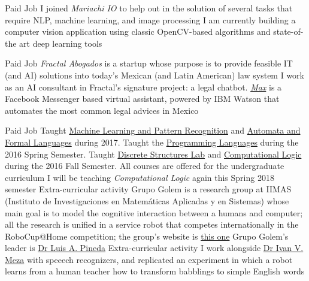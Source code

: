 \documentclass[11pt,a4paper,sans]{moderncv} %
\begin{document}
        {Paid Job}
        {I joined \emph{Mariachi IO} to help out in the solution of several tasks that require NLP, machine learning, and image processing}
        {I am currently building a computer vision application using classic OpenCV-based algorithms and state-of-the art deep learning tools}
        {}
        {}

        {Paid Job}
        {\emph{Fractal Abogados} is a startup whose purpose is to provide feasible IT (and AI) solutions into today's Mexican (and Latin American) law system}
        {I work as an AI consultant in Fractal's signature project: a legal chatbot. \href{https://m.me/fractal-abogados}{\emph{Max}} is a Facebook Messenger based virtual assistant, powered by IBM Watson that automates the most common legal advices in Mexico}
        {}
        {}

        {Paid Job}
        {Taught \href{http://turing.iimas.unam.mx/~ivanvladimir/page/curso_rpyaa}{Machine Learning and Pattern Recognition} and \href{https://sites.google.com/site/automataslengformales20172/}{Automata and Formal Languages} during 2017. Taught the \href{https://sites.google.com/site/lengprog20162/}{Programming Languages} during the 2016 Spring Semester. Taught \href{https://sites.google.com/a/ciencias.unam.mx/estructuras-discretas/home}{Discrete Structures Lab} and \href{https://sites.google.com/site/logcompunam20171/home}{Computational Logic} during the 2016 Fall Semester. All courses are offered for the undergraduate curriculum}
        {I will be teaching \emph{Computational Logic} again this Spring 2018 semester}{}{}
        {Extra-curricular activity}
        {Grupo Golem is a research group at IIMAS (Instituto de Investigaciones en Matem\'{a}ticas Aplicadas y en Sistemas) whose main goal is to model the cognitive interaction between a humans and computer; all the research is unified in a service robot that competes internationally in the RoboCup@Home competition; the group's website is \href{http://golem.iimas.unam.mx/home.php?lang=en&sec=home}{this one}}
        {Grupo Golem's leader is \href{http://turing.iimas.unam.mx/~luis/}{Dr Luis A. Pineda}}{}{}
        {Extra-curricular activity}
        {I work alongside \href{http://turing.iimas.unam.mx/~ivanvladimir/}{Dr Ivan V. Meza} with speeech recognizers, and replicated an experiment in which a robot learns from a human teacher how to transform babblings to simple English words}
        {}{}{}
\end{document}
